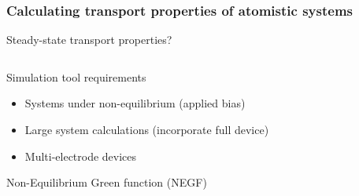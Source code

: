 \begin{framenologo}
  \frametitle{Calculating transport properties of atomistic systems}
  
  \begin{center}
    Steady-state transport properties?
  \end{center}
  
  \begin{columns}
    \begin{column}{.5\linewidth}
    \end{column}
    \begin{column}{.5\linewidth}
    \end{column}
  \end{columns}
  
  \begin{columns}
    \begin{column}{.6\linewidth}
      \begin{block}{Simulation tool requirements}
        \begin{itemize}
          \item Systems under non-equilibrium (applied bias)
          \item Large system calculations (incorporate full device)
          \item Multi-electrode devices
        \end{itemize}
      \end{block}

      \begin{center}
        Non-Equilibrium Green function (NEGF)
      \end{center}

    \end{column}
    \begin{column}{.4\linewidth}
      \begin{center}
      \end{center}
    \end{column}
  \end{columns}

  
\end{framenologo}

